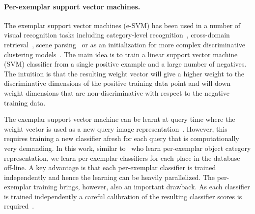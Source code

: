     

\paragraph{Per-exemplar support vector machines.} 
  The exemplar support vector machines (e-SVM) has been used in a number of visual recognition tasks including category-level recognition~\cite{Malisiewicz11}, cross-domain retrieval~\cite{Shrivastava11}, scene parsing~\cite{Tighe13} or as an initialization  for more complex discriminative clustering models~\cite{Doersch12,Singh12}. The main idea is to train a linear support vector machine (SVM) classifier from a single positive example and a large number of negatives. The intuition is that the resulting weight vector will give a higher weight to the discriminative dimensions of the positive training data point and will down weight dimensions that are non-discriminative with respect to the negative training data. 
  
  \textcolor{petr}{
    The exemplar support vector machine can be learnt at query time where the weight vector is used as a new query image representation~\cite{Shrivastava11}. However, this requires training a new classifier afresh for each query that is computationally very demanding. In this work, similar to~\cite{Malisiewicz11} who learn per-exemplar object category representation, we learn per-exemplar classifiers for each place in the database off-line.  A key advantage is that each per-exemplar classifier is trained independently and hence the learning can be heavily parallelized. The per-exemplar training brings, however, also an important drawback. As each classifier is trained independently a careful calibration of the resulting classifier scores is required~\cite{Malisiewicz11}.
    }
    
